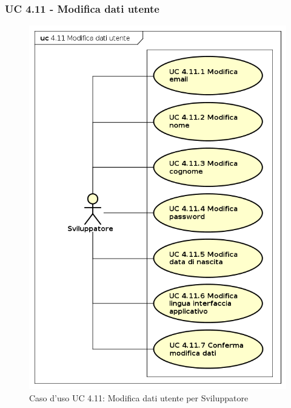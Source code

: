 \subsubsection{UC 4.11 - Modifica dati utente}
\begin{figure}[H]
	\centering
	\includegraphics[width=12cm, keepaspectratio]{img/UC411.png} 
	\caption{Caso d'uso UC 4.11:  Modifica dati utente per Sviluppatore}\label{fig:411}
\end{figure}
